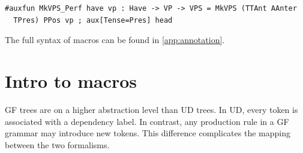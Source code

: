 





\begin{verbatim}
#auxfun MkVPS_Perf have vp : Have -> VP -> VPS = MkVPS (TTAnt AAnter 
  TPres) PPos vp ; aux[Tense=Pres] head
\end{verbatim}

The full syntax of macros can be found in \autoref{app:annotation}.

\section{Intro to macros}


GF trees are on a higher abstraction level than UD trees. In UD, every token is associated with a dependency label. In contrast, any production rule in a GF grammar may introduce new tokens. This difference complicates the mapping between the two formalisms.

